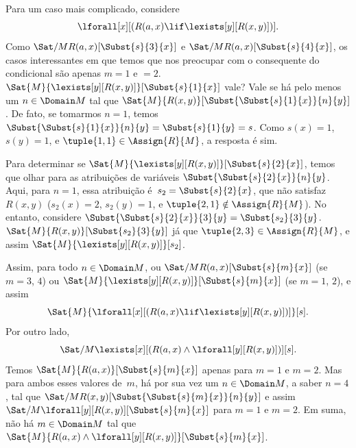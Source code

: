 \documentclass[../../../include/open-logic-section]{subfiles}
\begin{document}
\begin{ex}

Para um caso mais complicado, considere
\[
\lforall[x][(R(a,x) \lif \lexists[y][R(x,y)])].
\]
Como $\Sat/{M}{R(a,x)}[\Subst{s}{3}{x}]$ e
$\Sat/{M}{R(a,x)}[\Subst{s}{4}{x}]$, os casos interessantes em que
temos que nos preocupar com o consequente do condicional são apenas $m = 1$
e $ = 2$. $\Sat{M}{\lexists[y][R(x,y)]}[\Subst{s}{1}{x}]$
vale? Vale se há pelo menos um $n \in \Domain M$ tal que
$\Sat{M}{R(x,y)}[\Subst{\Subst{s}{1}{x}}{n}{y}]$. De fato, se tomarmos
$n = 1$, temos $\Subst{\Subst{s}{1}{x}}{n}{y} = \Subst{s}{1}{y} =
s$. Como $s(x) = 1$, $s(y) = 1$, e $\tuple{1,1} \in \Assign{R}{M}$,
a resposta é sim.

Para determinar se $\Sat{M}{\lexists[y][R(x,y)]}[\Subst{s}{2}{x}]$,
temos que olhar para as atribuições de variáveis
$\Subst{\Subst{s}{2}{x}}{n}{y}$. Aqui, para $n = 1$, essa atribuição
é~$s_2 = \Subst{s}{2}{x}$, que não satisfaz $R(x,y)$ ($s_2(x) =
2$, $s_2(y) = 1$, e $\tuple{2,1}\notin \Assign{R}{M}$). No entanto,
considere $\Subst{\Subst{s}{2}{x}}{3}{y} = \Subst{s_2}{3}{y}$.
$\Sat{M}{R(x,y)}[\Subst{s_2}{3}{y}]$ já que $\tuple{2,3} \in
\Assign{R}{M}$, e assim $\Sat{M}{\lexists[y][R(x,y)]}[s_2]$.

Assim, para todo $n \in \Domain M$, ou
$\Sat/{M}{R(a,x)}[\Subst{s}{m}{x}]$ (se $m = 3$, $4$) ou
$\Sat{M}{\lexists[y][R(x,y)]}[\Subst{s}{m}{x}]$ (se $m = 1$, $2$), e assim
\[
\Sat{M}{\lforall[x][(R(a,x) \lif \lexists[y][R(x,y)])]}[s].
\]
Por outro lado,
\[
\Sat/{M}{\lexists[x][(R(a,x) \land \lforall[y][R(x,y)])]}[s].
\]
Temos $\Sat{M}{R(a,x)}[\Subst{s}{m}{x}]$ apenas para $m = 1$ e $m =
2$. Mas para ambos esses valores de~$m$, há por sua vez um $n \in
\Domain M$, a saber $n = 4$, tal que
$\Sat/{M}{R(x,y)}[\Subst{\Subst{s}{m}{x}}{n}{y}]$ e assim
$\Sat/{M}{\lforall[y][R(x,y)]}[\Subst{s}{m}{x}]$ para $m = 1$ e $m =
2$. Em suma, não há $m \in \Domain M$ tal que $\Sat{M}{R(a,x)
\land \lforall[y][R(x,y)]}[\Subst{s}{m}{x}]$.
\end{ex}
\end{document}
